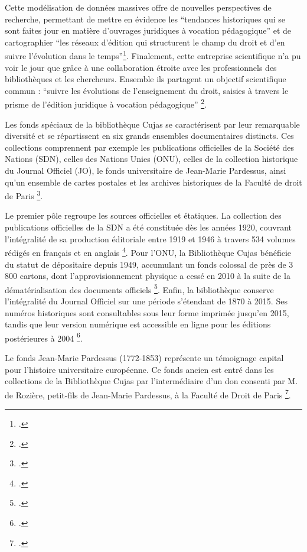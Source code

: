 Cette modélisation de données massives offre de nouvelles perspectives de recherche, permettant de mettre en évidence les \enquote{tendances historiques qui se sont faites jour en matière d'ouvrages juridiques à vocation pédagogique} et de cartographier \enquote{les réseaux d'édition qui structurent le champ du droit et d'en suivre l'évolution dans le temps}\footcite{HoppeDroit}. Finalement, cette entreprise scientifique n'a pu voir le jour que grâce à une collaboration étroite avec les professionnels des bibliothèques et les chercheurs. Ensemble ils partagent un objectif scientifique commun : \enquote{suivre les évolutions de l'enseignement du droit, saisies à travers le prisme de l'édition juridique à vocation pédagogique} \footcite{HoppeDroit}. 
	
Les fonds spéciaux de la bibliothèque Cujas se caractérisent par leur remarquable diversité et se répartissent en six grands ensembles documentaires distincts. Ces collections comprennent par exemple les publications officielles de la Société des Nations (SDN), celles des Nations Unies (ONU), celles de la collection historique du Journal Officiel (JO), le fonds universitaire de Jean-Marie Pardessus, ainsi qu'un ensemble de cartes postales et les archives historiques de la Faculté de droit de Paris \footcite{BibliothequeInteruniversitaireCujas}. 

Le premier pôle regroupe les sources officielles et étatiques. La collection des publications officielles de la SDN a été constituée dès les années 1920, couvrant l'intégralité de sa production éditoriale entre 1919 et 1946 à travers 534 volumes rédigés en français et en anglais \footcite{BibliothequeInteruniversitaireCujas}. Pour l'ONU, la Bibliothèque Cujas bénéficie du statut de dépositaire depuis 1949, accumulant un fonds colossal de près de 3 800 cartons, dont l'approvisionnement physique a cessé en 2010 à la suite de la dématérialisation des documents officiels \footcite{BibliothequeInteruniversitaireCujas}. Enfin, la bibliothèque conserve l'intégralité du Journal Officiel sur une période s'étendant de 1870 à 2015. Ses numéros historiques sont consultables sous leur forme imprimée jusqu'en 2015, tandis que leur version numérique est accessible en ligne pour les éditions postérieures à 2004 \footcite{BibliothequeInteruniversitaireCujas}.

Le fonds Jean-Marie Pardessus (1772-1853) représente un témoignage capital pour l’histoire universitaire européenne. Ce fonds ancien est entré dans les collections de la Bibliothèque Cujas par l'intermédiaire d'un don consenti par M. de Rozière, petit-fils de Jean-Marie Pardessus, à la Faculté de Droit de Paris \footcite{BibliothequeInteruniversitaireCujas}. 

